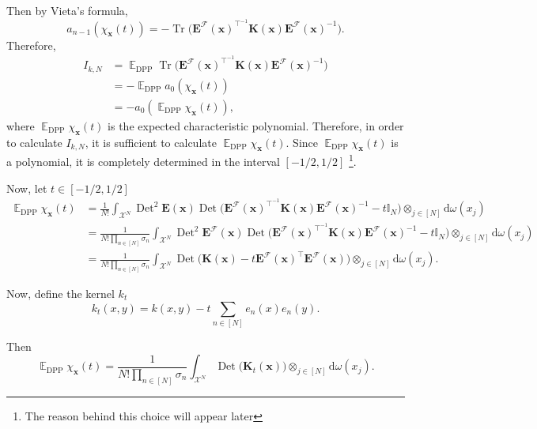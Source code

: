 \documentclass[twoside,11pt]{book}
\numberwithin{theorem}{chapter}
\numberwithin{definition}{chapter}
\numberwithin{proposition}{chapter}
\numberwithin{corollary}{chapter}
\numberwithin{example}{chapter}
\numberwithin{lemma}{chapter}
\numberwithin{assumption}{chapter}
\numberwithin{equation}{chapter}
\numberwithin{figure}{chapter}
\DeclareMathOperator{\Tr}{Tr}
\DeclareMathOperator{\Det}{Det}
\DeclareMathOperator{\DPP}{\mathrm{DPP}}
\DeclareMathOperator{\Tran}{\intercal}
\DeclareMathOperator{\EX}{\mathbb{E}}
\begin{document}
Then by Vieta's formula, 
\begin{equation}
a_{n-1}(\chi_{\bm{x}}(t)) = -\Tr \Big(\bm{E}^{\mathcal{F}}(\bm{x})^{\Tran^{-1}}\bm{K}(\bm{x})\bm{E}^{\mathcal{F}}(\bm{x})^{-1} \Big).
\end{equation}
Therefore,
\begin{align}
I_{k,N}  & = \EX_{\DPP} \Tr \Big(\bm{E}^{\mathcal{F}}(\bm{x})^{\Tran^{-1}}\bm{K}(\bm{x})\bm{E}^{\mathcal{F}}(\bm{x})^{-1} \Big) \nonumber\\
& = -\EX_{\DPP} a_{0}(\chi_{\bm{x}}(t)) \nonumber\\
& = -a_{0}(\EX_{\DPP} \chi_{\bm{x}}(t)),
\end{align}
where $\EX_{\DPP} \chi_{\bm{x}}(t)$ is the expected characteristic polynomial. Therefore, in order to calculate $I_{k,N}$, it is sufficient to calculate $\EX_{\DPP} \chi_{\bm{x}}(t)$. Since $\EX_{\DPP} \chi_{\bm{x}}(t)$ is a polynomial, it is completely determined in the interval $[-1/2,1/2]$ \footnote{The reason behind this choice will appear later}.  

Now, let $t \in [-1/2,1/2]$
\begin{align}\label{eq:EX_chi_x}
 \EX_{\DPP} \chi_{\bm{x}}(t) & = \frac{1}{N!} \int_{\mathcal{X}^{N}} \Det^{2}\bm{E}(\bm{x}) \Det \Big( \bm{E}^{\mathcal{F}}(\bm{x})^{\Tran^{-1}}\bm{K}(\bm{x})\bm{E}^{\mathcal{F}}(\bm{x})^{-1}  - t \mathbb{I}_{N} \Big) \otimes_{j \in [N]} \mathrm{d}\omega(x_{j}) \nonumber\\
& = \frac{1}{N!\prod\limits_{n \in [N]}\sigma_{n}} \int_{\mathcal{X}^{N}} \Det^{2}\bm{E}^{\mathcal{F}}(\bm{x}) \Det \Big( \bm{E}^{\mathcal{F}}(\bm{x})^{\Tran^{-1}}\bm{K}(\bm{x})\bm{E}^{\mathcal{F}}(\bm{x})^{-1}  - t \mathbb{I}_{N} \Big) \otimes_{j \in [N]} \mathrm{d}\omega(x_{j}) \nonumber\\
& = \frac{1}{N!\prod\limits_{n \in [N]}\sigma_{n}} \int_{\mathcal{X}^{N}} \Det \Big( \bm{K}(\bm{x})  - t \bm{E}^{\mathcal{F}}(\bm{x})^{\Tran} \bm{E}^{\mathcal{F}}(\bm{x}) \Big) \otimes_{j \in [N]} \mathrm{d}\omega(x_{j}).
\end{align}

Now, define the kernel $k_{t}$ 
\begin{equation}
k_{t}(x,y) = k(x,y) - t\sum\limits_{n \in [N]}e_{n}(x)e_{n}(y).
\end{equation}

Then
\begin{equation}
\EX_{\DPP} \chi_{\bm{x}}(t) = \frac{1}{N!\prod\limits_{n \in [N]}\sigma_{n}} \int_{\mathcal{X}^{N}} \Det \big( \bm{K}_{t}(\bm{x}) \big) \otimes_{j \in [N]} \mathrm{d}\omega(x_{j}).
\end{equation}
\end{document}
